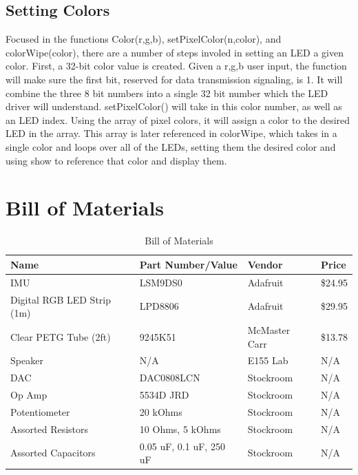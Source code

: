 \documentclass[11pt]{article}
\begin{document}
\subsection{Setting Colors}
Focused in the functions Color(r,g,b), setPixelColor(n,color), and colorWipe(color), there are a number of steps involed in setting an LED a given color. First, a 32-bit color value is created. Given a r,g,b user input, the function will make sure the first bit, reserved for data transmission signaling, is 1. It will combine the three 8 bit numbers into a single 32 bit number which the LED driver will understand. setPixelColor() will take in this color number, as well as an LED index. Using the array of pixel colors, it will assign a color to the desired LED in the array. This array is later referenced in colorWipe, which takes in a single color and loops over all of the LEDs, setting them the desired color and using show to reference that color and display them.  


\section{Bill of Materials}

\begin{table}[h!]
\centering
\begin{tabular}{|l|l|l|l|}
\hline
Name                       & Part Number/Value       & Vendor        & Price   \\ \hline
IMU                        & LSM9DS0                 & Adafruit      & \$24.95 \\ \hline
Digital RGB LED Strip (1m) & LPD8806                 & Adafruit      & \$29.95 \\ \hline
Clear PETG Tube (2ft)      & 9245K51                 & McMaster Carr & \$13.78 \\ \hline
Speaker                    & N/A                     & E155 Lab      & N/A     \\ \hline
DAC                        & DAC0808LCN              & Stockroom     & N/A     \\ \hline
Op Amp                     & 5534D JRD               & Stockroom     & N/A     \\ \hline
Potentiometer              & 20 kOhms                & Stockroom     & N/A     \\ \hline
Assorted Resistors         & 10 Ohms, 5 kOhms        & Stockroom     & N/A     \\ \hline
Assorted Capacitors        & 0.05 uF, 0.1 uF, 250 uF & Stockroom     & N/A     \\ \hline
\end{tabular}
\caption{Bill of Materials}
\end{table}
\end{document}
